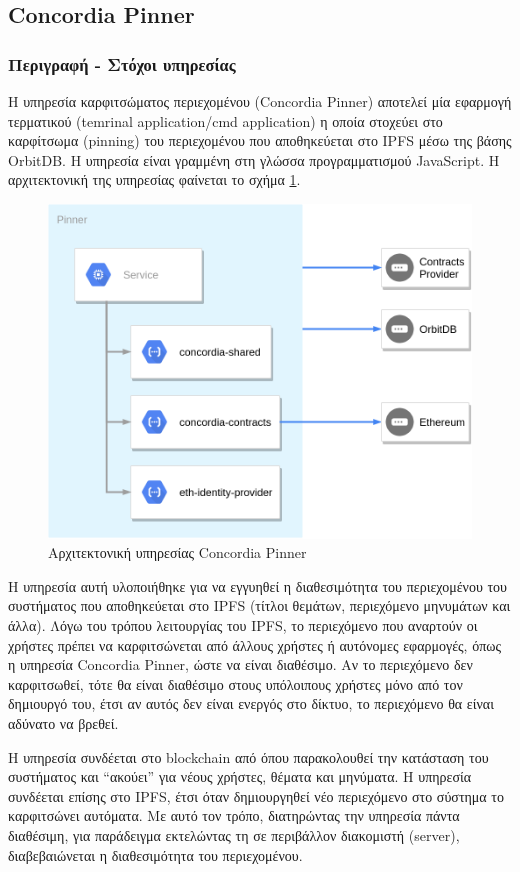 \subsection{Concordia Pinner} \label{subsection:4-3-4-concordia-pinner-service}

\subsubsection{Περιγραφή - Στόχοι υπηρεσίας}

Η υπηρεσία καρφιτσώματος περιεχομένου (Concordia Pinner) αποτελεί μία εφαρμογή τερματικού (temrinal application/cmd application) η οποία στοχεύει στο καρφίτσωμα (pinning) του περιεχομένου που αποθηκεύεται στο IPFS μέσω της βάσης OrbitDB. Η υπηρεσία είναι γραμμένη στη γλώσσα προγραμματισμού JavaScript. Η αρχιτεκτονική της υπηρεσίας φαίνεται το σχήμα \ref{figure:4-3-concordia-pinner-architecture}.

\begin{figure}[H]
    \centering
    \includegraphics[width=.6\textwidth]{assets/figures/chapter-4/4.3.architecture-4.3.4.concordia-pinner-architecture.png}
    \caption{Αρχιτεκτονική υπηρεσίας Concordia Pinner}
    \label{figure:4-3-concordia-pinner-architecture}
\end{figure}

Η υπηρεσία αυτή υλοποιήθηκε για να εγγυηθεί η διαθεσιμότητα του περιεχομένου του συστήματος που αποθηκεύεται στο IPFS (τίτλοι θεμάτων, περιεχόμενο μηνυμάτων και άλλα). Λόγω του τρόπου λειτουργίας του IPFS, το περιεχόμενο που αναρτούν οι χρήστες πρέπει να καρφιτσώνεται από άλλους χρήστες ή αυτόνομες εφαρμογές, όπως η υπηρεσία Concordia Pinner, ώστε να είναι διαθέσιμο. Αν το περιεχόμενο δεν καρφιτσωθεί, τότε θα είναι διαθέσιμο στους υπόλοιπους χρήστες μόνο από
τον δημιουργό του, έτσι αν αυτός δεν είναι ενεργός στο δίκτυο, το περιεχόμενο θα είναι αδύνατο να βρεθεί.

Η υπηρεσία συνδέεται στο blockchain από όπου παρακολουθεί την κατάσταση του συστήματος και ``ακούει'' για νέους χρήστες, θέματα και μηνύματα. Η υπηρεσία συνδέεται επίσης στο IPFS, έτσι όταν δημιουργηθεί νέο περιεχόμενο στο σύστημα το καρφιτσώνει αυτόματα. Με αυτό τον τρόπο, διατηρώντας την υπηρεσία πάντα διαθέσιμη, για παράδειγμα εκτελώντας τη σε περιβάλλον διακομιστή (server), διαβεβαιώνεται η διαθεσιμότητα του περιεχομένου.

